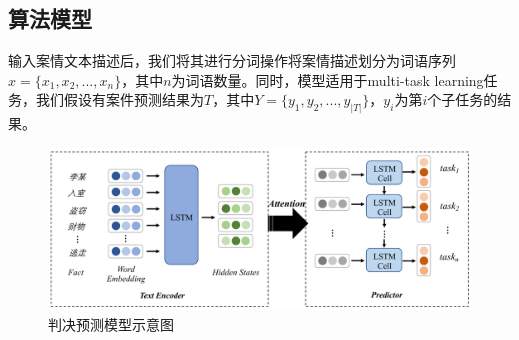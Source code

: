 \subsection{算法模型}
输入案情文本描述后，我们将其进行分词操作将案情描述划分为词语序列$x = \{x_{1}, x_{2}, ..., x_{n}\}$，其中$n$为词语数量。同时，模型适用于multi-task learning任务，我们假设有案件预测结果为$T$，其中$Y = \{y_{1}, y_{2}, ..., y_{|T|}\}$，$y_{i}$为第$i$个子任务的结果。

\begin{figure}[ht]
    \centering
    \includegraphics[width=\linewidth]{figures/model1}
    \caption{判决预测模型示意图}
    \label{fig:model1}
\end{figure}

